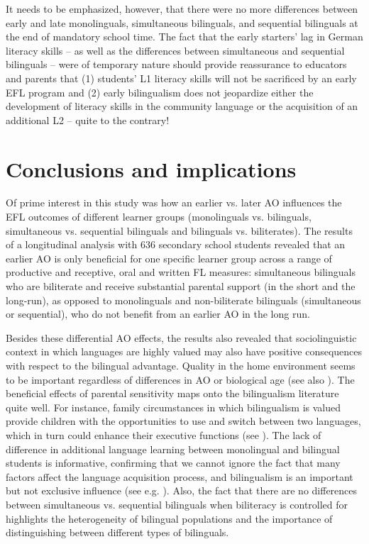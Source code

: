\documentclass[output=paper,modfonts,nonflat,newtxmath]{langsci/langscibook}
\begin{document}
It needs to be emphasized, however, that there were no more differences between early and late monolinguals, simultaneous bilinguals, and sequential bilinguals at the end of mandatory school time. The fact that the early starters’ lag in German literacy skills – as well as the differences between simultaneous and sequential bilinguals – were of temporary nature should provide reassurance to educators and parents that (1) students’ L1 literacy skills will not be sacrificed by an early EFL program and (2) early bilingualism does not jeopardize either the development of literacy skills in the community language or the acquisition of an additional L2 – quite to the contrary!\\

\section{Conclusions and implications}
\label{sec:pfenninger:6}

Of prime interest in this study was how an earlier vs. later AO influences the EFL outcomes of different learner groups (monolinguals vs. bilinguals, simultaneous vs. sequential bilinguals and bilinguals vs. biliterates). The results of a longitudinal analysis with 636 secondary school students revealed that an earlier AO is only beneficial for one specific learner group across a range of productive and receptive, oral and written FL measures: simultaneous bilinguals who are biliterate and receive substantial parental support (in the short and the long-run), as opposed to monolinguals and non-biliterate bilinguals (simultaneous or sequential), who do not benefit from an earlier AO in the long run.

Besides these differential AO effects, the results also revealed that sociolinguistic context in which languages are highly valued may also have positive consequences with respect to the bilingual advantage. Quality in the home environment seems to be important regardless of differences in AO or biological age (see also \citealt{PfenningerSingleton2019}). The beneficial effects of parental sensitivity maps onto the bilingualism literature quite well. For instance, family circumstances in which bilingualism is valued provide children with the opportunities to use and switch between two languages, which in turn could enhance their executive functions (see \citealt{GoriotEtAl2016}). The lack of difference in additional language learning between monolingual and bilingual students is informative, confirming that we cannot ignore the fact that many factors affect the language acquisition process, and bilingualism is an important but not exclusive influence (see e.g. \citealt{Cenoz2009}). Also, the fact that there are no differences between simultaneous vs. sequential bilinguals when biliteracy is controlled for highlights the heterogeneity of bilingual populations and the importance of distinguishing between different types of bilinguals.
\end{document}
